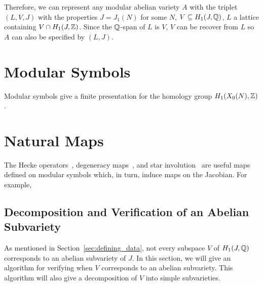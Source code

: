 Therefore, we can represent any modular abelian variety $A$ with the triplet
$(L, V, J)$ with the properties $J=J_1(N)$ for some $N$, $V\subseteq H_1(J,
\mathbb{Q})$, $L$ a lattice containing $V\cap H_1(J, \mathbb{Z})$. Since the $\mathbb{Q}$-span of
$L$ is $V$, $V$ can be recover from $L$ so $A$ can also be specified by $(L,
J)$.

\section{Modular Symbols}
\label{sec:modular_symbols}

Modular symbols give a finite presentation for the homology group $H_1(X_0(N),
\mathbb{Z})$.

\section{Natural Maps}%
\label{sec:alg_natural_maps}
The Hecke operators~\cite[\S 8.3]{stein:modform}, degeneracy maps~\cite[\S
8.6]{stein:modform}, and star involution~\cite[\S 8.5]{stein:modform} are
useful maps defined on modular symbols which, in turn, induce maps on the
Jacobian. For example, %

\subsection{Decomposition and Verification of an Abelian Subvariety}
\label{sec:decomp_verify}

As mentioned in Section~\ref{sec:defining_data}, not every subspace $V$ of
$H_1(J, \mathbb{Q})$ corresponds to an abelian subvariety of $J$. In this section, we
will give an algorithm for verifying when $V$ corresponds to an abelian
subvariety. This algorithm will also give a decomposition of $V$ into simple
subvarieties.

